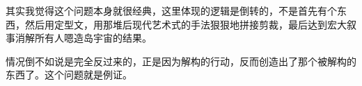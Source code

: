 \begin{zhihuanswer}
其实我觉得这个问题本身就很经典，这里体现的逻辑是倒转的，不是首先有个东西，然后用定型文，用那堆后现代艺术式的手法狠狠地拼接剪裁，最后达到宏大叙事消解所有人嗯造岛宇宙的结果。

情况倒不如说是完全反过来的，正是因为解构的行动，反而创造出了那个被解构的东西了。这个问题就是例证。
\end{zhihuanswer}
